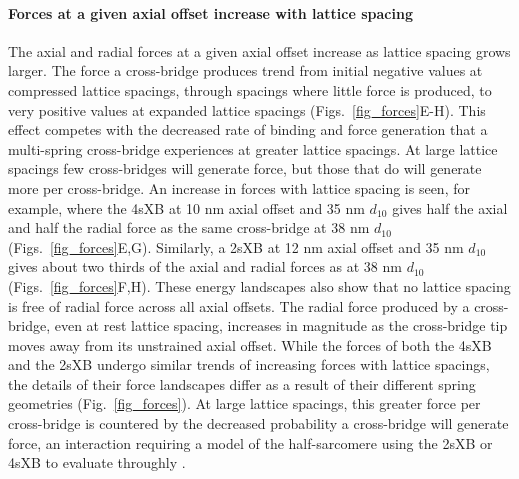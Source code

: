 \documentclass[]{article}
\begin{document}
\paragraph{Forces at a given axial offset increase with lattice spacing} %
The axial and radial forces at a given axial offset increase as lattice spacing grows larger.
The force a cross-bridge produces trend from initial negative values at compressed lattice spacings, through spacings where little force is produced, to very positive values at expanded lattice spacings (Figs.~\ref{fig_forces}E-H). 
This effect competes with the decreased rate of binding and force generation that a multi-spring cross-bridge experiences at greater lattice spacings. 
At large lattice spacings few cross-bridges will generate force, but those that do will generate more per cross-bridge. 
An increase in forces with lattice spacing is seen, for example, where the 4sXB at 10 nm axial offset and 35 nm $d_{10}$ gives half the axial and half the radial force as the same cross-bridge at 38 nm $d_{10}$ (Figs.~\ref{fig_forces}E,G). 
Similarly, a 2sXB at 12 nm axial offset and 35 nm $d_{10}$ gives about two thirds of the axial and radial forces as at 38 nm $d_{10}$ (Figs.~\ref{fig_forces}F,H).  
These energy landscapes also show that no lattice spacing is free of radial force across all axial offsets.  
The radial force produced by a cross-bridge, even at rest lattice spacing, increases in magnitude as the cross-bridge tip moves away from its unstrained axial offset. 
While the forces of both the 4sXB and the 2sXB undergo similar trends of increasing forces with lattice spacings, the details of their force landscapes differ as a result of their different spring geometries (Fig.~\ref{fig_forces}). 
At large lattice spacings, this greater force per cross-bridge is countered by the decreased probability a cross-bridge will generate force, an interaction requiring a model of the half-sarcomere using the 2sXB or 4sXB to evaluate throughly \citep{Martyn2004}. 
\end{document}
